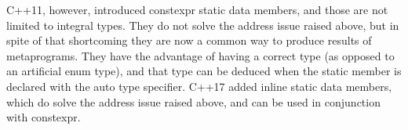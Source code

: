 C++11, however, introduced constexpr static data members, and those are not limited to integral types. They do not solve the address issue raised above, but in spite of that shortcoming they are now a common way to produce results of metaprograms. They have the advantage of having a correct type (as opposed to an artificial enum type), and that type can be deduced when the static member is declared with the auto type specifier. C++17 added inline static data members, which do solve the address issue raised above, and can be used in conjunction with constexpr.
























